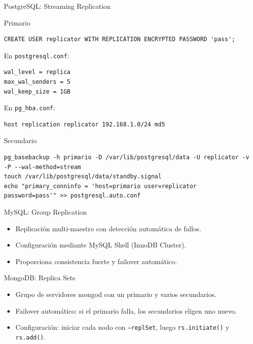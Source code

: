 \documentclass[aspectratio=169, 10pt, xcolor=table]{beamer}
\begin{document}
\begin{frame}[fragile]{PostgreSQL: Streaming Replication}
    \begin{block}{Primario}
        \begin{lstlisting}[style=sqlstyle]
CREATE USER replicator WITH REPLICATION ENCRYPTED PASSWORD 'pass';
        \end{lstlisting}
        En \texttt{postgresql.conf}:
        \begin{lstlisting}[style=bashstyle]
wal_level = replica
max_wal_senders = 5
wal_keep_size = 1GB
        \end{lstlisting}
        En \texttt{pg\_hba.conf}:
        \begin{lstlisting}[style=bashstyle]
host replication replicator 192.168.1.0/24 md5
        \end{lstlisting}
    \end{block}
    \begin{block}{Secundario}
        \begin{lstlisting}[style=bashstyle]
pg_basebackup -h primario -D /var/lib/postgresql/data -U replicator -v -P --wal-method=stream
touch /var/lib/postgresql/data/standby.signal
echo "primary_conninfo = 'host=primario user=replicator password=pass'" >> postgresql.auto.conf
        \end{lstlisting}
    \end{block}
\end{frame}

\begin{frame}{MySQL: Group Replication}
    \begin{itemize}
        \item Replicación multi-maestro con detección automática de fallos.
        \item Configuración mediante MySQL Shell (InnoDB Cluster).
        \item Proporciona consistencia fuerte y failover automático.
    \end{itemize}
\end{frame}

\begin{frame}{MongoDB: Replica Sets}
    \begin{itemize}
        \item Grupo de servidores mongod con un primario y varios secundarios.
        \item Failover automático: si el primario falla, los secundarios eligen uno nuevo.
        \item Configuración: iniciar cada nodo con \texttt{--replSet}, luego \texttt{rs.initiate()} y \texttt{rs.add()}.
    \end{itemize}
\end{frame}
\end{document}
